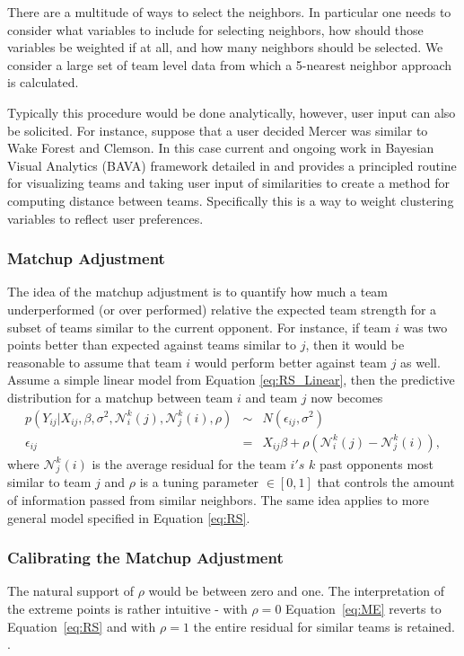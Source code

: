 There are a multitude of ways to select the neighbors. In particular one needs to consider what variables to include for selecting neighbors, how should those variables be weighted if at all, and how many neighbors should be selected. We consider a large set of team level data from which a 5-nearest neighbor approach is calculated. 

Typically this procedure would be done analytically, however, user input can also be solicited. For instance, suppose that a user decided Mercer was similar to Wake Forest and Clemson. In this case current and ongoing work in Bayesian Visual Analytics (BAVA) framework detailed in \cite{house2010}  and  provides a principled routine for visualizing teams and taking user input of similarities to create a method for computing distance between teams. Specifically this is a way to weight clustering variables to reflect user preferences.
\subsubsection{Matchup Adjustment}
The idea of the matchup adjustment is to quantify how much a team underperformed (or over performed) relative the expected team strength for a subset of teams similar to the current opponent. For instance, if team $i$ was two points better than expected against teams similar to $j$, then it would be reasonable to assume that team $i$ would perform better against team $j$ as well.  Assume a simple linear model from Equation \ref{eq:RS_Linear}, then the predictive distribution for a matchup between team $i$ and team $j$ now becomes 
\begin{eqnarray}
p(Y_{ij}|X_{ij}, \beta,\sigma^2,\mathcal{N}_i^k(j),\mathcal{N}_j^k(i), \rho) &\sim& N(\epsilon_{ij}, \sigma^2) \\
\epsilon_{ij} &=& X_{ij} \beta + \rho(\mathcal{N}_i^k(j) -\mathcal{N}_j^k(i)),
\label{eq:ME}
\end{eqnarray}
where $\mathcal{N}_j^k(i)$ is the average residual for the team $i's$ $k$ past opponents most similar to team $j$ and $\rho$ is a tuning parameter $\in [0,1]$ that controls the amount of information passed from similar neighbors. The same idea applies to more general model specified in Equation \ref{eq:RS}.

\subsubsection{Calibrating the Matchup Adjustment}
The natural support of $\rho$ would be between zero and one.  The interpretation of the extreme points is rather intuitive - with $\rho = 0$ Equation~\ref{eq:ME} reverts to Equation~\ref{eq:RS} and with $\rho = 1$ the entire residual for similar teams is retained. .


